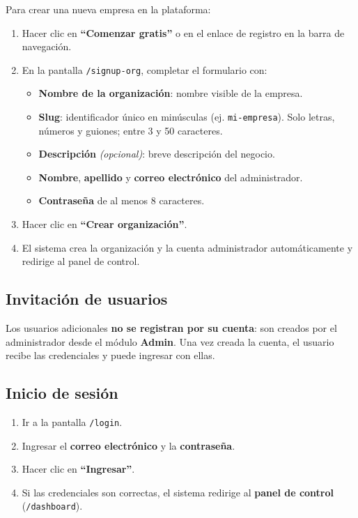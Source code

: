 Para crear una nueva empresa en la plataforma:

\begin{enumerate}
\def\labelenumi{\arabic{enumi}.}
\tightlist
\item
  Hacer clic en \textbf{``Comenzar gratis''} o en el enlace de registro en la barra de navegación.
\item
  En la pantalla \texttt{/signup-org}, completar el formulario con:

  \begin{itemize}
  \tightlist
  \item
    \textbf{Nombre de la organización}: nombre visible de la empresa.
  \item
    \textbf{Slug}: identificador único en minúsculas (ej. \texttt{mi-empresa}). Solo letras, números y guiones; entre 3 y 50 caracteres.
  \item
    \textbf{Descripción} \emph{(opcional)}: breve descripción del negocio.
  \item
    \textbf{Nombre}, \textbf{apellido} y \textbf{correo electrónico} del administrador.
  \item
    \textbf{Contraseña} de al menos 8 caracteres.
  \end{itemize}
\item
  Hacer clic en \textbf{``Crear organización''}.
\item
  El sistema crea la organización y la cuenta administrador automáticamente y redirige al panel de control.
\end{enumerate}

\subsection{Invitación de usuarios}\label{invitaciuxf3n-de-usuarios}

Los usuarios adicionales \textbf{no se registran por su cuenta}: son creados por el administrador desde el módulo \textbf{Admin}. Una vez creada la cuenta, el usuario recibe las credenciales y puede ingresar con ellas.

\subsection{Inicio de sesión}\label{inicio-de-sesiuxf3n}

\begin{enumerate}
\def\labelenumi{\arabic{enumi}.}
\tightlist
\item
  Ir a la pantalla \texttt{/login}.
\item
  Ingresar el \textbf{correo electrónico} y la \textbf{contraseña}.
\item
  Hacer clic en \textbf{``Ingresar''}.
\item
  Si las credenciales son correctas, el sistema redirige al \textbf{panel de control} (\texttt{/dashboard}).
\end{enumerate}

